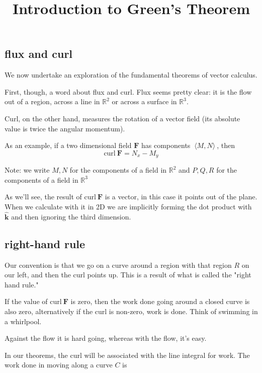 \documentclass[11pt, oneside]{article}
\title{Introduction to Green's Theorem}
\date{}
\begin{document}
\maketitle
\Large


\label{sec:green}

\subsection*{flux and curl}

We now undertake an exploration of the fundamental theorems of vector calculus.

First, though, a word about flux and curl.  Flux seems pretty clear:  it is the flow out of a region, across a line in $\mathbb{R}^2$ or across a surface in $\mathbb{R}^3$.

Curl, on the other hand, measures the rotation of a vector field (its absolute value is twice the angular momentum).  

As an example, if a two dimensional field $\mathbf{F}$ has components $\ \langle M,N \rangle \ $, then
\[ \text{curl} \ \mathbf{F} = N_x - M_y \]

Note:  we write $M,N$ for the components of a field in $\mathbb{R}^2$ and $P,Q,R$ for the components of a field in $\mathbb{R}^3$

As we'll see, the result of $\text{curl} \ \mathbf{F}$ is a vector, in this case it points out of the plane.  When we calculate with it in 2D we are implicitly forming the dot product with $\hat{\mathbf{k}}$ and then ignoring the third dimension.

\subsection*{right-hand rule}

Our convention is that we go on a curve around a region with that region $R$ on our left, and then the curl points up.  This is a result of what is called the "right hand rule."

If the value of $\text{curl} \ \mathbf{F}$ is zero, then the work done going around a closed curve is also zero, alternatively if the curl is non-zero, work is done.  Think of swimming in a whirlpool.

Against the flow it is hard going, whereas with the flow, it's easy.

In our theorems, the curl will be associated with the line integral for work.  The work done in moving along a curve $C$ is
\end{document}
